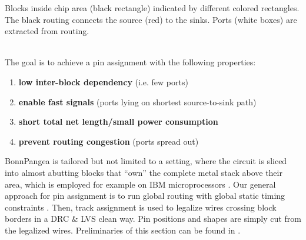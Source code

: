 \documentclass[a2paper]{bigsposter}
\begin{document}
\begin{blockrow}[3]
\begin{minipage}{0.45\blockwidth}
    \raggedright
    {\footnotesize \begin{spacing}{0.9}
    		Blocks inside chip area (black rectangle) indicated by different colored rectangles. The black routing connects the source (red) to the sinks. Ports (white boxes) are extracted from routing.\end{spacing}	}
    \end{minipage}\\

 \label{sec:modfied_global;_routing}
 The goal is to achieve a pin assignment with the following properties:
 \begin{enumerate}
 	\item \textbf{low inter-block dependency} (i.e. few ports)
 	\item \textbf{enable fast signals} (ports lying on shortest source-to-sink path)
 	\item \textbf{short total net length/small power consumption}
 	\item \textbf{prevent routing congestion} (ports spread out)
 \end{enumerate}
 BonnPangea is tailored but not limited to a setting, where the
 circuit is sliced into almost abutting blocks that ``own'' the
 complete metal stack above their area, which is employed for example
 on IBM microprocessors \cite{kazda+pangea:21}.
Our general approach for pin assignment is to run global routing with
global static timing constraints \cite{BRGTiming2}. Then, track
assignment \cite{BatterywalaTrackAssign,duran:2024} is used  to legalize wires crossing block borders in a DRC \& LVS clean way.
Pin positions and shapes are simply cut from the legalized wires.
Preliminaries of this section can be found in \cite{kazda+pangea:21}. 


\end{blockrow}
\end{document}
